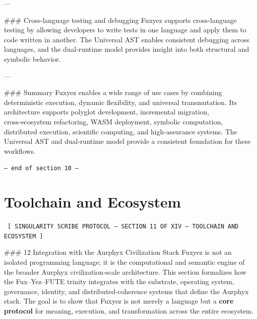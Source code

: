 \documentclass[12pt, a4paper]{book}
\begin{document}
---

\#\#\# Cross‑language testing and debugging  
Fuxyez supports cross‑language testing by allowing developers to write tests in one language and apply them to code written in another. The Universal AST enables consistent debugging across languages, and the dual‑runtime model provides insight into both structural and symbolic behavior.

---

\#\#\# Summary  
Fuxyez enables a wide range of use cases by combining deterministic execution, dynamic flexibility, and universal transmutation. Its architecture supports polyglot development, incremental migration, cross‑ecosystem refactoring, WASM deployment, symbolic computation, distributed execution, scientific computing, and high‑assurance systems. The Universal AST and dual‑runtime model provide a consistent foundation for these workflows.
    
    \vspace{1cm}
    \begin{center}
    \color{alienPurple}\texttt{--- end of section 10 ---}
    \end{center}
    \clearpage
    

    \chapter*{Toolchain and Ecosystem}
    
    
    \begin{glyphbox}
    \centering
    \color{neonCyan}\fontsize{8}{10}\selectfont\texttt{
    [ SINGULARITY SCRIBE PROTOCOL -- SECTION 11 OF XIV -- TOOLCHAIN AND ECOSYSTEM ]
    }
    \end{glyphbox}
    \vspace{0.3cm}
    
    
    \#\#\# 12 Integration with the Aurphyx Civilization Stack  
Fuxyez is not an isolated programming language; it is the computational and semantic engine of the broader Aurphyx civilization‑scale architecture. This section formalizes how the Fux–Yez–FUTE trinity integrates with the substrate, operating system, governance, identity, and distributed‑coherence systems that define the Aurphyx stack. The goal is to show that Fuxyez is not merely a language but a \textbf{core protocol} for meaning, execution, and transformation across the entire ecosystem.
\end{document}
